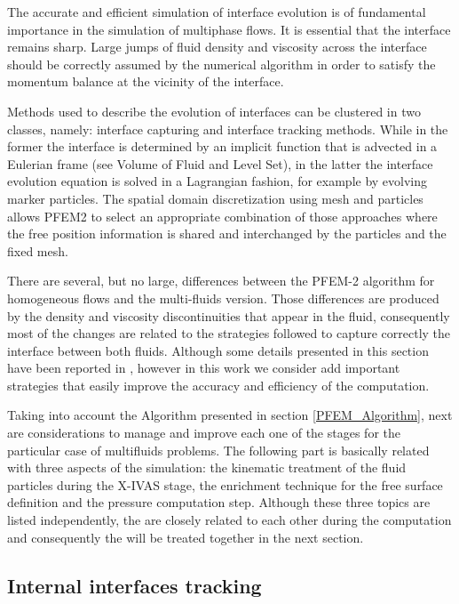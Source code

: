 The accurate and efficient simulation of interface evolution is of fundamental importance in the simulation of multiphase flows. It is essential that the interface remains sharp. Large jumps of fluid density and viscosity across the interface should be correctly assumed by the numerical algorithm in order to satisfy the momentum balance at the vicinity of the interface.

Methods used to describe the evolution of interfaces can be clustered in two classes, namely: interface capturing and interface tracking methods. While in the former the interface is determined by an implicit function that is advected in a Eulerian frame (see Volume of Fluid \cite{VoF} and Level Set\cite{Osher01}), in the latter the interface evolution equation is solved in a Lagrangian fashion, for example by evolving marker particles. The spatial domain discretization using mesh and particles allows PFEM2 to select an appropriate combination of those approaches where the free position information is shared and interchanged by the particles and the fixed mesh.

There are several, but no large, differences between the PFEM-2 algorithm for homogeneous flows and the multi-fluids version. Those differences are produced by the density and viscosity discontinuities that appear in the fluid, consequently most of the changes are related to the strategies followed to capture correctly the interface between both fluids. Although some details presented in this section have been reported in \cite{Idelsohn13c}, however in this work we consider add important strategies that easily improve the accuracy and efficiency of the computation.

Taking into account the Algorithm presented in section \ref{PFEM_Algorithm}, next are considerations to manage and improve each one of the stages for the particular case of multifluids problems. The following part is basically related with three aspects of the simulation: the kinematic treatment of the fluid particles during the X-IVAS stage, the enrichment technique for the free surface definition and the pressure computation step. Although these three topics are listed independently, the are closely related to each other during the computation and consequently the will be treated together in the next section.

\subsection{Internal interfaces tracking}

